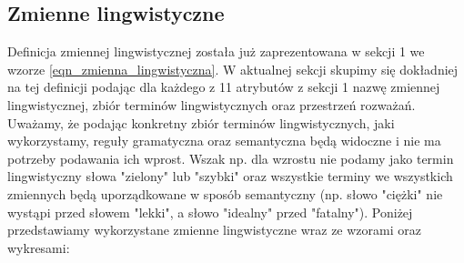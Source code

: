 \documentclass{classrep}
\begin{document}
\subsection{Zmienne lingwistyczne}
Definicja zmiennej lingwistycznej została już zaprezentowana w sekcji 1 we wzorze \ref{eqn_zmienna_lingwistyczna}. W aktualnej sekcji skupimy się dokładniej na tej definicji podając dla każdego z 11 atrybutów z sekcji 1 nazwę zmiennej lingwistycznej, zbiór terminów lingwistycznych oraz przestrzeń rozważań. Uważamy, że podając konkretny zbiór terminów lingwistycznych, jaki wykorzystamy, reguły gramatyczna oraz semantyczna będą widoczne i nie ma potrzeby podawania ich wprost. Wszak np. dla wzrostu nie podamy jako termin lingwistyczny słowa "zielony" lub "szybki" oraz wszystkie terminy we wszystkich zmiennych będą uporządkowane w sposób semantyczny (np. słowo "ciężki" nie wystąpi przed słowem "lekki", a słowo "idealny" przed "fatalny"). Poniżej przedstawiamy wykorzystane zmienne lingwistyczne wraz ze wzorami oraz wykresami:
\end{document}
